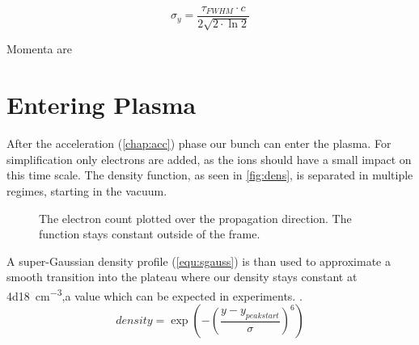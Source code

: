 \documentclass[bachelor_thesis]{subfiles}
\begin{document}
\begin{equation}
\sigma_{y}=\frac{\tau_{FWHM}\cdot c}{2\sqrt{2\cdot\ln{2}}}
\label{equ:sigma_y}
\end{equation} 

Momenta are 

\section{Entering Plasma}\label{chap:plasma}
 After the acceleration (\autoref{chap:acc}) phase our bunch can enter the plasma. For simplification only electrons are added, as the ions should have a small impact on this time scale.
The density function, as seen in \autoref{fig:dens}, is separated in multiple regimes, starting in the vacuum. 
\begin{figure}
\missingfigure{}
\caption{The electron count plotted over the propagation direction. The function stays constant outside of the frame.}\label{fig:dens}
\end{figure}
A super-Gaussian density profile (\autoref{equ:sgauss}) is than used to approximate a smooth transition into the plateau where our density stays constant at \qty{4d18}{\cm^{-3}},a value which can be expected in experiments. \cite{Schoebel2022}. 
\begin{equation}
density = \exp\left(-\left(\frac{y-y_{peak start}}{\sigma}\right)^6\right)
\label{equ:sgauss}
\end{equation}
\end{document}
